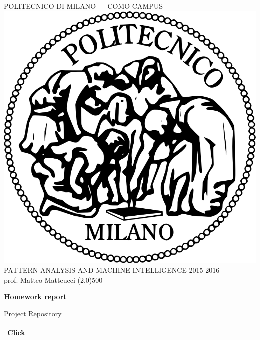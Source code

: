 \documentclass[a4paper,12pt,titlepage]{article} %
\begin{document}
\begin{titlepage}

\begin{center}
	POLITECNICO DI MILANO --- COMO CAMPUS\\
	\vspace{10pt}
	\includegraphics[scale=0.1]{logo-polimi.png}\\
	\vspace{10pt}
	PATTERN ANALYSIS AND MACHINE INTELLIGENCE 2015-2016\\
	prof. Matteo Matteucci	
	\line(2,0){500}
\end{center}

\vspace{60pt}

\begin{center}
	{\Huge \textbf{Homework report}}\\
\end{center}

\vspace{60pt}

\begin{center}
	{\large Project Repository}
\end{center}
\begin{tabularx}{\textwidth}{|X|}
	\hline
	\href{https://github.com/attillax/PAMI-2015}{Click}\\
	\hline
\end{tabularx}


\end{titlepage}
\end{document}

